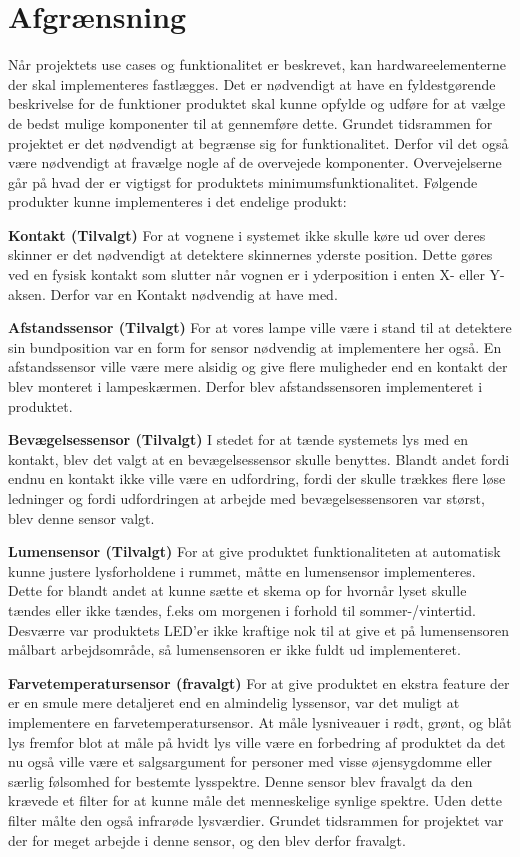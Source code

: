 \chapter{Afgrænsning}

Når projektets use cases og funktionalitet er beskrevet, kan hardwareelementerne der skal implementeres fastlægges. Det er nødvendigt at have en fyldestgørende beskrivelse for de funktioner produktet skal kunne opfylde og udføre for at vælge de bedst mulige komponenter til at gennemføre dette. Grundet tidsrammen for projektet er det nødvendigt at begrænse sig for funktionalitet. Derfor vil det også være nødvendigt at fravælge nogle af de overvejede komponenter. Overvejelserne går på hvad der er vigtigst for produktets minimumsfunktionalitet.
Følgende produkter kunne implementeres i det endelige produkt:

\textbf{Kontakt (Tilvalgt)}
For at vognene i systemet ikke skulle køre ud over deres skinner er det nødvendigt at detektere skinnernes yderste position. Dette gøres ved en fysisk kontakt som slutter når vognen er i yderposition i enten X- eller Y-aksen. Derfor var en Kontakt nødvendig at have med. 

\textbf{Afstandssensor (Tilvalgt)}
For at vores lampe ville være i stand til at detektere sin bundposition var en form for sensor nødvendig at implementere her også. En afstandssensor ville være mere alsidig og give flere muligheder end en kontakt der blev monteret i lampeskærmen. Derfor blev afstandssensoren implementeret i produktet.

\textbf{Bevægelsessensor (Tilvalgt)}
I stedet for at tænde systemets lys med en kontakt, blev det valgt at en bevægelsessensor skulle benyttes. Blandt andet fordi endnu en kontakt ikke ville være en udfordring, fordi der skulle trækkes flere løse ledninger og fordi udfordringen at arbejde med bevægelsessensoren var størst, blev denne sensor valgt.

\textbf{Lumensensor (Tilvalgt)}
For at give produktet funktionaliteten at automatisk kunne justere lysforholdene i rummet, måtte en lumensensor implementeres. Dette for blandt andet at kunne sætte et skema op for hvornår lyset skulle tændes eller ikke tændes, f.eks om morgenen i forhold til sommer-/vintertid. Desværre var produktets LED’er ikke kraftige nok til at give et på lumensensoren målbart arbejdsområde, så lumensensoren er ikke fuldt ud implementeret.

\textbf{Farvetemperatursensor (fravalgt)}
For at give produktet en ekstra feature der er en smule mere detaljeret end en almindelig lyssensor, var det muligt at implementere en farvetemperatursensor. At måle lysniveauer i rødt, grønt, og blåt lys fremfor blot at måle på hvidt lys ville være en forbedring af produktet da det nu også ville være et salgsargument for personer med visse øjensygdomme eller særlig følsomhed for bestemte lysspektre. Denne sensor blev fravalgt da den krævede et filter for at kunne måle det menneskelige synlige spektre. Uden dette filter målte den også infrarøde lysværdier. Grundet tidsrammen for projektet var der for meget arbejde i denne sensor, og den blev derfor fravalgt.  

